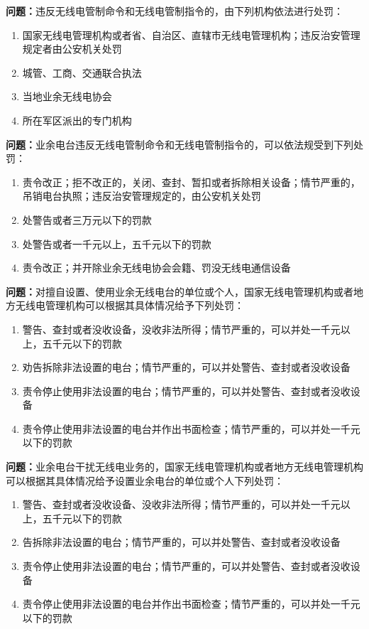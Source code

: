 \textbf{问题：}违反无线电管制命令和无线电管制指令的，由下列机构依法进行处罚：
\begin{enumerate}[label=\Alph*), leftmargin=1cm]
	\item 国家无线电管理机构或者省、自治区、直辖市无线电管理机构；违反治安管理规定者由公安机关处罚
	\item 城管、工商、交通联合执法
	\item 当地业余无线电协会
	\item 所在军区派出的专门机构
\end{enumerate}

\textbf{问题：}业余电台违反无线电管制命令和无线电管制指令的，可以依法规受到下列处罚：
\begin{enumerate}[label=\Alph*), leftmargin=1cm]
	\item  责令改正；拒不改正的，关闭、查封、暂扣或者拆除相关设备；情节严重的，吊销电台执照；违反治安管理规定的，由公安机关处罚
	\item  处警告或者三万元以下的罚款
	\item  处警告或者一千元以上，五千元以下的罚款
	\item  责令改正；并开除业余无线电协会会籍、罚没无线电通信设备
\end{enumerate}


\textbf{问题：}对擅自设置、使用业余无线电台的单位或个人，国家无线电管理机构或者地方无线电管理机构可以根据其具体情况给予下列处罚：
\begin{enumerate}[label=\Alph*), leftmargin=1cm]
	\item  警告、查封或者没收设备，没收非法所得；情节严重的，可以并处一千元以上，五千元以下的罚款
	\item  劝告拆除非法设置的电台；情节严重的，可以并处警告、查封或者没收设备
	\item  责令停止使用非法设置的电台；情节严重的，可以并处警告、查封或者没收设备
	\item  责令停止使用非法设置的电台并作出书面检查；情节严重的，可以并处一千元以下的罚款
\end{enumerate}

\textbf{问题：}业余电台干扰无线电业务的，国家无线电管理机构或者地方无线电管理机构可以根据其具体情况给予设置业余电台的单位或个人下列处罚：
\begin{enumerate}[label=\Alph*), leftmargin=1cm]
	\item  警告、查封或者没收设备、没收非法所得；情节严重的，可以并处一千元以上，五千元以下的罚款
	\item  告拆除非法设置的电台；情节严重的，可以并处警告、查封或者没收设备
	\item  责令停止使用非法设置的电台；情节严重的，可以并处警告、查封或者没收设备
	\item  责令停止使用非法设置的电台并作出书面检查；情节严重的，可以并处一千元以下的罚款
\end{enumerate}


